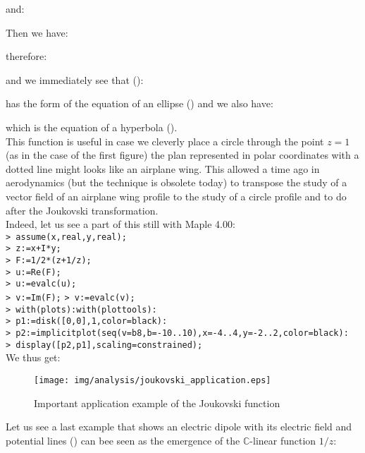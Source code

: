 \begin{tcolorbox}[colframe=black,colback=white,sharp corners,breakable]
	and:
	
	Then we have:
	
	therefore:
	
	and we immediately see that ():
	
	has the form of the equation of an ellipse () and we also have:
	
	which is the equation of a hyperbola ().\\

	This function is useful in case we cleverly place a circle through the point $z=1$ (as in the case of the first figure) the plan represented in polar coordinates with a dotted line might looks like an airplane wing. This allowed a time ago in aerodynamics (but the technique is obsolete today) to transpose the study of a vector field of an airplane wing profile to the study of a circle profile and to do after the Joukovski transformation.\\
	
	Indeed, let us see a part of this still with Maple 4.00:\\

\texttt{> assume(x,real,y,real);}\\
\texttt{> z:=x+I*y;}\\
\texttt{> F:=1/2*(z+1/z);}\\
\texttt{> u:=Re(F);}\\
\texttt{> u:=evalc(u);}\\
\texttt{> v:=Im(F);}
\texttt{> v:=evalc(v);}\\
\texttt{> with(plots):with(plottools):}\\
\texttt{> p1:=disk([0,0],1,color=black):}\\
\texttt{> p2:=implicitplot({seq(v=b8,b=-10..10)},x=-4..4,y=-2..2,color=black):}\\
\texttt{> display([p2,p1],scaling=constrained);}\\

	We thus get:

	\begin{figure}[H]
		\begin{center}
			\texttt{[image: img/analysis/joukovski\_application.eps]}
		\end{center}	
		\caption{Important application example of the Joukovski function}
	\end{figure}

	\end{tcolorbox}
	Let us see a last example that shows an electric dipole with its electric field and potential lines () can bee seen as the emergence of the $\mathbb{C}$-linear function $1/z$:

